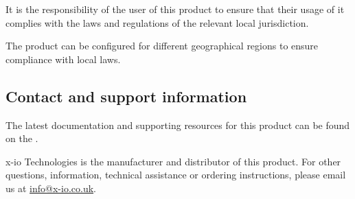It is the responsibility of the user of this product to ensure that their usage of it complies with the laws and regulations of the relevant local jurisdiction.

The product can be configured for different geographical regions to ensure compliance with local laws.

\subsection{Contact and support information}

The latest documentation and supporting resources for this product can be found on the \productWebPage.

x-io Technologies is the manufacturer and distributor of this product. For other questions, information, technical assistance or ordering instructions, please email us at \href{mailto:info@x-io.co.uk}{info@x-io.co.uk}.
